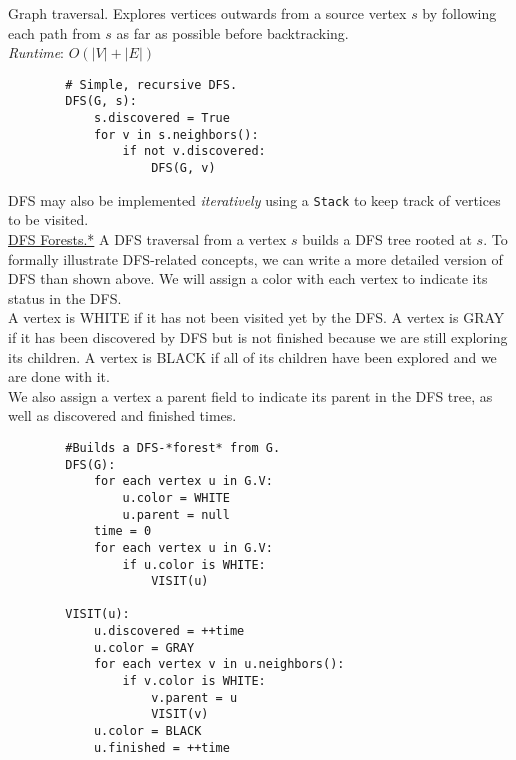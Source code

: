 \documentclass[12pt, fleqn]{general}
\begin{document}
\begin{multicols*}{2}
    Graph traversal. Explores vertices outwards from a source vertex $s$ by following each path from $s$ as far as possible before backtracking.\\

    \emph{Runtime}: $O(|V| + |E|)$

    \begin{framed}
    \begingroup
    \makeatletter
    \@totalleftmargin=-1.5cm
    \begin{verbatim}
        # Simple, recursive DFS.
        DFS(G, s):
            s.discovered = True
            for v in s.neighbors():
                if not v.discovered:
                    DFS(G, v)
    \end{verbatim}
    \makeatother
    \endgroup
    \end{framed}

    DFS may also be implemented \emph{iteratively} using a \texttt{Stack} to keep track of vertices to be visited.\\

    \underline{DFS Forests.*} A DFS traversal from a vertex $s$ builds a DFS tree rooted at $s$. To formally illustrate DFS-related concepts, we can write a more detailed version of DFS than shown above. We will assign a color with each vertex to indicate its status in the DFS.\\

    A vertex is WHITE if it has not been visited yet by the DFS. A vertex is GRAY if it has been discovered by DFS but is not finished because we are still exploring its children. A vertex is BLACK if all of its children have been explored and we are done with it.\\

    We also assign a vertex a parent field to indicate its parent in the DFS tree, as well as discovered and finished times.\\

    \newpage

    \begin{framed}
    \begingroup
    \makeatletter
    \@totalleftmargin=-1.5cm
    \begin{verbatim}
        #Builds a DFS-*forest* from G.
        DFS(G):
            for each vertex u in G.V:
                u.color = WHITE
                u.parent = null
            time = 0
            for each vertex u in G.V:
                if u.color is WHITE:
                    VISIT(u)

        VISIT(u):
            u.discovered = ++time
            u.color = GRAY
            for each vertex v in u.neighbors():
                if v.color is WHITE:
                    v.parent = u
                    VISIT(v)
            u.color = BLACK
            u.finished = ++time
    \end{verbatim}
    \makeatother
    \endgroup
    \end{framed}


\end{multicols*}
\end{document}
